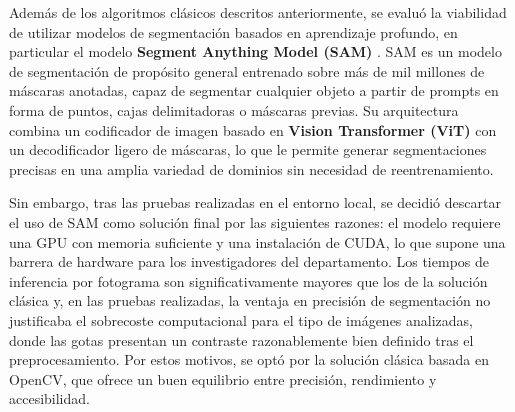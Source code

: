 Además de los algoritmos clásicos descritos anteriormente, se evaluó la viabilidad de utilizar modelos de segmentación basados en aprendizaje profundo, en particular el modelo \textbf{Segment Anything Model (SAM)} \cite{kirillov2023sam}. SAM es un modelo de segmentación de propósito general entrenado sobre más de mil millones de máscaras anotadas, capaz de segmentar cualquier objeto a partir de prompts en forma de puntos, cajas delimitadoras o máscaras previas. Su arquitectura combina un codificador de imagen basado en \textbf{Vision Transformer (ViT)} con un decodificador ligero de máscaras, lo que le permite generar segmentaciones precisas en una amplia variedad de dominios sin necesidad de reentrenamiento.

Sin embargo, tras las pruebas realizadas en el entorno local, se decidió descartar el uso de SAM como solución final por las siguientes razones: el modelo requiere una GPU con memoria suficiente y una instalación de CUDA, lo que supone una barrera de hardware para los investigadores del departamento. Los tiempos de inferencia por fotograma son significativamente mayores que los de la solución clásica y, en las pruebas realizadas, la ventaja en precisión de segmentación no justificaba el sobrecoste computacional para el tipo de imágenes analizadas, donde las gotas presentan un contraste razonablemente bien definido tras el preprocesamiento. Por estos motivos, se optó por la solución clásica basada en OpenCV, que ofrece un buen equilibrio entre precisión, rendimiento y accesibilidad.